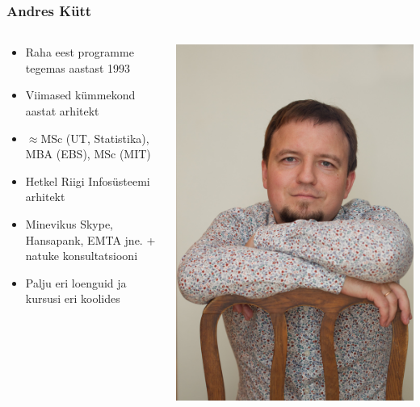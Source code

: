 \begin{frame}[fragile]
	\frametitle{Andres Kütt}
	\begin{columns}[t]
		\begin{column}{7cm}
			\begin{itemize}
				\item Raha eest programme tegemas aastast 1993
				\item Viimased kümmekond aastat arhitekt
				\item $\approx$MSc (UT, Statistika), MBA (EBS), MSc (MIT)
				\item Hetkel Riigi Infosüsteemi arhitekt
				\item Minevikus Skype, Hansapank, EMTA jne. + natuke konsultatsiooni
				\item Palju eri loenguid ja kursusi eri koolides
			\end{itemize}
		\end{column}
		\begin{column}[T]{3cm}
			\includegraphics[width=\textwidth]{author.jpg}
		\end{column}
	\end{columns}
\end{frame}

